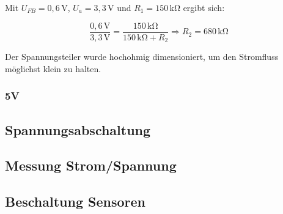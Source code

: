 Mit $U_{FB}=0,6\,\si{\volt}$, $U_a=3,3\,\si{\volt}$ und $R_1=150\,\si{\kilo\ohm}$ ergibt sich:

\begin{minipage}{\textwidth}
\begin{equation}\label{eq:Spannungsteiler}
\frac {0,6\,\si{\volt}}{3,3\,\si{\volt}}{=}  \frac{150\,\si{\kilo\ohm}}{150\,\si{\kilo\ohm}+R_2} \Rightarrow R_2=680\,\si{\kilo\ohm}
\end{equation}
\end{minipage}

Der Spannungsteiler wurde hochohmig dimensioniert, um den Stromfluss möglichst klein zu halten.


\subsubsection{5V}\label{subsubsec.5v}


\subsection{Spannungsabschaltung}\label{subsec.Spannungsabschaltung}

\subsection{Messung Strom/Spannung}\label{subsec.MessungStromSpannung}

\subsection{Beschaltung Sensoren}\label{subsec.BeschaltungSensoren}



